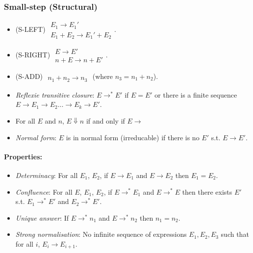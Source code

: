 \documentclass[twocolumn,english]{article}
\begin{document}
\subsubsection{Small-step (Structural)}
\begin{itemize}
\item {\scriptsize{}(S-LEFT)} $\begin{array}{c}
E_{1}\rightarrow E_{1}'\\
\hline E_{1}+E_{2}\rightarrow E_{1}'+E_{2}
\end{array}$.
\item {\scriptsize{}(S-RIGHT)} $\begin{array}{c}
E\rightarrow E'\\
\hline n+E\rightarrow n+E'
\end{array}$.
\item {\scriptsize{}(S-ADD)} $\begin{array}{c}
\\
\hline n_{1}+n_{2}\rightarrow n_{3}
\end{array}$ (where $n_{3}=n_{1}+n_{2}$).
\item \emph{Reflexie transitive closure}: $E\rightarrow^{*}E'$ if $E=E'$
or there is a finite sequence $E\rightarrow E_{1}\rightarrow E_{2}\dots\rightarrow E_{k}\rightarrow E'$.
\item For all $E$ and $n$, $E\Downarrow n$ if and only if $E\rightarrow$
\item \emph{Normal form}: $E$ is in normal form (irreducable) if there
is no $E'$ s.t. $E\rightarrow E'$.
\end{itemize}

\paragraph{Properties:}
\begin{itemize}
\item \emph{Determinacy}: For all $E_{1}$, $E_{2}$, if $E\rightarrow E_{1}$
and $E\rightarrow E_{2}$ then $E_{1}=E_{2}$.
\item \emph{Confluence}: For all $E$, $E_{1}$, $E_{2}$, if $E\rightarrow^{*}E_{1}$
and $E\rightarrow^{*}E$ then there exists $E'$ s.t. $E_{1}\rightarrow^{*}E'$
and $E_{2}\rightarrow^{*}E'$.
\item \emph{Unique answer}: If $E\rightarrow^{*}n_{1}$ and $E\rightarrow^{*}n_{2}$
then $n_{1}=n_{2}$.
\item \emph{Strong normalisation}: No infinite sequence of expressions $E_{1},E_{2},E_{3}$
such that for all $i$, $E_{i}\rightarrow E_{i+1}$.
\end{itemize}
\end{document}
